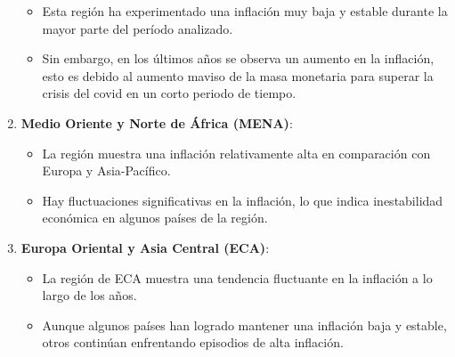 \documentclass[
]{article}
\providecommand{\tightlist}{%
  \setlength{\itemsep}{0pt}\setlength{\parskip}{0pt}}
\begin{document}
\begin{enumerate}
  \begin{itemize}
  \tightlist
  \item
    Esta región ha experimentado una inflación muy baja y estable
    durante la mayor parte del período analizado.
  \item
    Sin embargo, en los últimos años se observa un aumento en la
    inflación, esto es debido al aumento maviso de la masa monetaria
    para superar la crisis del covid en un corto periodo de tiempo.
  \end{itemize}
\item
  \textbf{Medio Oriente y Norte de África (MENA)}:

  \begin{itemize}
  \tightlist
  \item
    La región muestra una inflación relativamente alta en comparación
    con Europa y Asia-Pacífico.
  \item
    Hay fluctuaciones significativas en la inflación, lo que indica
    inestabilidad económica en algunos países de la región.
  \end{itemize}
\item
  \textbf{Europa Oriental y Asia Central (ECA)}:

  \begin{itemize}
  \tightlist
  \item
    La región de ECA muestra una tendencia fluctuante en la inflación a
    lo largo de los años.
  \item
    Aunque algunos países han logrado mantener una inflación baja y
    estable, otros continúan enfrentando episodios de alta inflación.
  \end{itemize}
\end{enumerate}
\end{document}
